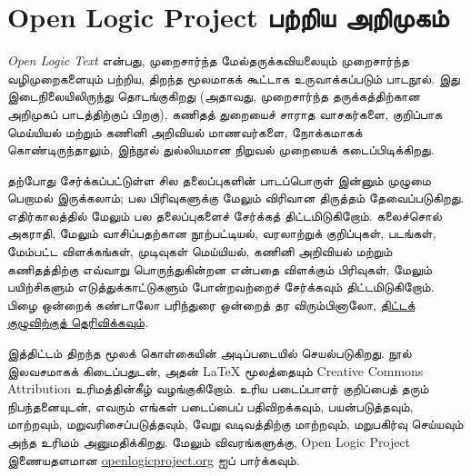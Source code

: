 \chapter*{Open Logic Project பற்றிய அறிமுகம்}

\textit{Open Logic Text} என்பது, முறைசார்ந்த மேல்தருக்கவியலையும்
முறைசார்ந்த வழிமுறைகளையும் பற்றிய, திறந்த மூலமாகக் கூட்டாக
உருவாக்கப்படும் பாடநூல். இது இடைநிலையிலிருந்து தொடங்குகிறது
(அதாவது, முறைசார்ந்த தருக்கத்திற்கான அறிமுகப் பாடத்திற்குப் பிறகு).
கணிதத் துறையைச் சாராத வாசகர்களை, குறிப்பாக மெய்யியல் மற்றும்
கணினி அறிவியல் மாணவர்களை, நோக்கமாகக் கொண்டிருந்தாலும்,
இந்நூல் துல்லியமான நிறுவல் முறையைக் கடைப்பிடிக்கிறது.

தற்போது சேர்க்கப்பட்டுள்ள சில தலைப்புகளின் பாடப்பொருள் இன்னும்
முழுமை பெறாமல் இருக்கலாம்; பல பிரிவுகளுக்கு மேலும் விரிவான
திருத்தம் தேவைப்படுகிறது. எதிர்காலத்தில் மேலும் பல தலைப்புகளைச்
சேர்க்கத் திட்டமிடுகிறோம். கலைச்சொல் அகராதி, மேலும் வாசிப்பதற்கான
நூற்பட்டியல், வரலாற்றுக் குறிப்புகள், படங்கள், மேம்பட்ட விளக்கங்கள்,
முடிவுகள் மெய்யியல், கணினி அறிவியல் மற்றும் கணிதத்திற்கு எவ்வாறு
பொருந்துகின்றன என்பதை விளக்கும் பிரிவுகள், மேலும் பயிற்சிகளும்
எடுத்துக்காட்டுகளும் போன்றவற்றைச் சேர்க்கவும் திட்டமிடுகிறோம்.
பிழை ஒன்றைக் கண்டாலோ பரிந்துரை ஒன்றைத் தர விரும்பினாலோ,
\href{https://github.com/OpenLogicProject/OpenLogic/wiki/Contributing}{திட்டக் குழுவிற்குத் தெரிவிக்கவும்}.

இத்திட்டம் திறந்த மூலக் கொள்கையின் அடிப்படையில் செயல்படுகிறது.
நூல் இலவசமாகக் கிடைப்பதுடன், அதன் LaTeX மூலத்தையும்
Creative Commons Attribution உரிமத்தின்கீழ் வழங்குகிறோம்.
உரிய படைப்பாளர் குறிப்பைத் தரும் நிபந்தனையுடன், எவரும்
எங்கள் படைப்பைப் பதிவிறக்கவும், பயன்படுத்தவும், மாற்றவும்,
மறுவரிசைப்படுத்தவும், வேறு வடிவத்திற்கு மாற்றவும், மறுபகிர்வு
செய்யவும் அந்த உரிமம் அனுமதிக்கிறது. மேலும் விவரங்களுக்கு,
Open Logic Project இணையதளமான
\href{http://openlogicproject.org/}{openlogicproject.org} ஐப் பார்க்கவும்.

